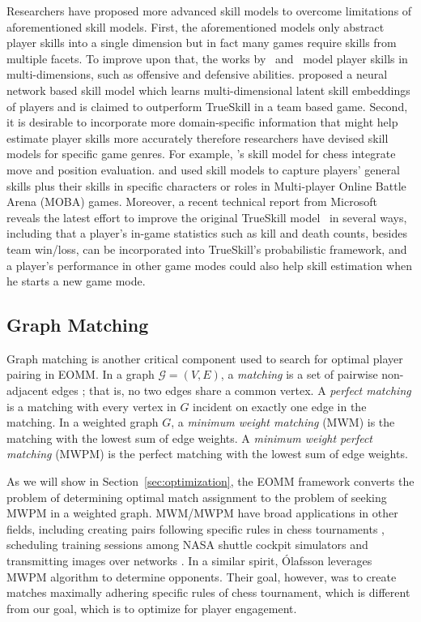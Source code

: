 Researchers have proposed more advanced skill models to overcome  limitations of aforementioned skill models. First, the aforementioned models only abstract player skills into a single dimension but in fact many games require skills from multiple facets. To improve upon that, the works by~\textcite{chen2016modeling} and~\textcite{stanescu2011rating} model player skills in multi-dimensions, such as offensive and defensive abilities. \textcite{Delalleau2012} proposed a neural network based skill model which learns multi-dimensional latent skill embeddings of players and is claimed to outperform TrueSkill in a team based game. Second, it is desirable to incorporate more domain-specific information that might help estimate player skills more accurately therefore researchers have devised skill models for specific game genres. For example,  \textcite{di2009skill}'s skill model for chess integrate move and position evaluation. \textcite{zhengxing2016player} and \textcite{suznjevic2015application} used skill models to capture players' general skills plus their skills in specific characters or roles in Multi-player Online Battle Arena (MOBA) games. Moreover, a recent technical report from Microsoft~\citep{trueskill2} reveals the latest effort to improve the original TrueSkill model~\citep{herbrich:trueskill} in several ways, including that a player's in-game statistics such as kill and death counts, besides team win/loss, can be incorporated into TrueSkill's probabilistic framework, and a player's performance in other game modes could also help skill estimation when he starts a new game mode.



\subsection{Graph Matching}
Graph matching is another critical component used to search for optimal player pairing in EOMM. In a graph $\mathcal{G}=(V, E)$, a \textit{matching} is a set of pairwise non-adjacent edges \cite{west2001introduction}; that is, no two edges share a common vertex. A \textit{perfect matching} is a matching with every vertex in $G$ incident on exactly one edge in the matching.  In a weighted graph $G$, a \textit{minimum weight matching } (MWM) is the matching with the lowest sum of edge weights. A \textit{minimum weight perfect matching} (MWPM) is the perfect matching with the lowest sum of edge weights.

As we will show in Section~\ref{sec:optimization}, the EOMM framework converts the problem of determining optimal match assignment to the problem of seeking MWPM in a weighted graph. MWM/MWPM have broad applications in other fields, including creating pairs following specific rules in chess tournaments \cite{olafsson1990weighted}, scheduling training sessions among NASA shuttle cockpit simulators \cite{bell1994weighted} and transmitting images over networks \cite{riskin1994index}. In a similar spirit, \'{O}lafsson \cite{olafsson1990weighted} leverages MWPM algorithm to determine opponents. Their goal, however, was to create matches maximally adhering specific rules of chess tournament, which is different from our goal, which is to optimize for player engagement.

